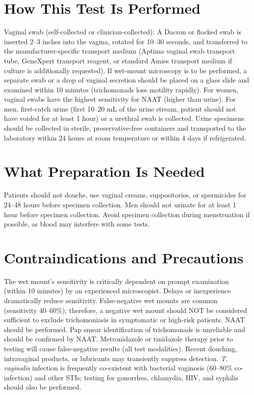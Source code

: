 \section*{How This Test Is Performed}
Vaginal swab (self-collected or clinician-collected): A Dacron or flocked swab is inserted 2--3 inches into the vagina, rotated for 10--30 seconds, and transferred to the manufacturer-specific transport medium (Aptima vaginal swab transport tube, GeneXpert transport reagent, or standard Amies transport medium if culture is additionally requested). If wet-mount microscopy is to be performed, a separate swab or a drop of vaginal secretion should be placed on a glass slide and examined within 10 minutes (trichomonads lose motility rapidly). For women, vaginal swabs have the highest sensitivity for NAAT (higher than urine). For men, first-catch urine (first 10--20 mL of the urine stream, patient should not have voided for at least 1 hour) or a urethral swab is collected. Urine specimens should be collected in sterile, preservative-free containers and transported to the laboratory within 24 hours at room temperature or within 4 days if refrigerated.

\section*{What Preparation Is Needed}
Patients should not douche, use vaginal creams, suppositories, or spermicides for 24--48 hours before specimen collection. Men should not urinate for at least 1 hour before specimen collection. Avoid specimen collection during menstruation if possible, as blood may interfere with some tests.

\section*{Contraindications and Precautions}
The wet mount's sensitivity is critically dependent on prompt examination (within 10 minutes) by an experienced microscopist. Delays or inexperience dramatically reduce sensitivity. False-negative wet mounts are common (sensitivity 40--60\%); therefore, a negative wet mount should NOT be considered sufficient to exclude trichomoniasis in symptomatic or high-risk patients. NAAT should be performed. Pap smear identification of trichomonads is unreliable and should be confirmed by NAAT. Metronidazole or tinidazole therapy prior to testing will cause false-negative results (all test modalities). Recent douching, intravaginal products, or lubricants may transiently suppress detection. \textit{T. vaginalis} infection is frequently co-existent with bacterial vaginosis (60--80\% co-infection) and other STIs; testing for gonorrhea, chlamydia, HIV, and syphilis should also be performed.

